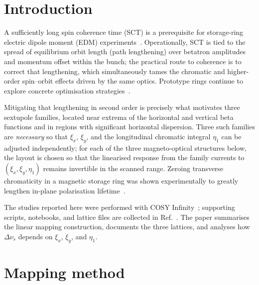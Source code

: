 \documentclass[%
               ]{jacow}
\begin{document}
\section{Introduction}
\par A sufficiently long spin coherence time (SCT) is a prerequisite for storage-ring electric dipole moment (EDM) experiments~\cite{melnikov22,senichev25}. Operationally, SCT is tied to the spread of equilibrium orbit length (path lengthening) over betatron amplitudes and momentum offset within the bunch; the practical route to coherence is to correct that lengthening, which simultaneously tames the chromatic and higher-order spin--orbit effects driven by the same optics. Prototype rings continue to explore concrete optimisation strategies~\cite{shankar23}.
\par Mitigating that lengthening in second order is precisely what motivates three sextupole families, located near extrema of the horizontal and vertical beta functions and in regions with significant horizontal dispersion. Three such families are \emph{necessary} so that \(\xi_x\), \(\xi_y\), and the longitudinal chromatic integral \(\eta_1\) can be adjusted independently; for each of the three magneto-optical structures below, the layout is chosen so that the linearised response from the family currents to \((\xi_x,\xi_y,\eta_1)\) remains invertible in the scanned range. Zeroing transverse chromaticity in a magnetic storage ring was shown experimentally to greatly lengthen in-plane polarisation lifetime~\cite{guidoboni18}.
\par The studies reported here were performed with COSY Infinity~\cite{cosy}; supporting scripts, notebooks, and lattice files are collected in Ref.~\cite{sctrepo}. The paper summarises the linear mapping construction, documents the three lattices, and analyses how \(\Delta\nu_s\) depends on \(\xi_x\), \(\xi_y\), and \(\eta_1\).

\section{Mapping method}
\end{document}
